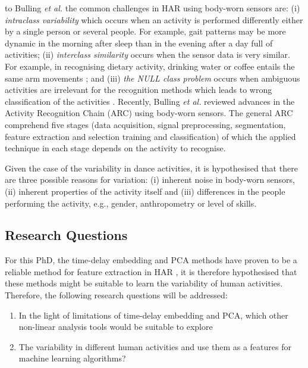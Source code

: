 \documentclass[10pt,journal,compsoc]{IEEEtran}
\begin{document}
 to Bulling \emph{et al.}  \cite{bulling2014} the common challenges in 
HAR using body-worn sensors are: 
(i) \textit{intraclass variability} which occurs when an activity is performed differently 
either by a single person or several people. For example, gait patterns may be more
dynamic in the morning after sleep than in the evening after a day full of activities; 
(ii) \textit{interclass similarity} occurs when the sensor data is very similar. For example,
in recognising dietary activity, drinking water or coffee entails the same arm movements 
\cite{amft2008phd};
and (iii) \textit{the NULL class problem} occurs 
when ambiguous activities are irrelevant for the recognition methods
which leads to wrong classification of the activities \cite{amft2011}.
Recently, Bulling \emph{et al.}  \cite{bulling2014} reviewed advances in 
the Activity Recognition Chain (ARC) using body-worn sensors.
The general ARC comprehend five stages (data acquisition, signal preprocessing, 
segmentation, feature extraction and selection training and classification) of which
the applied technique in each stage depends on the activity to recognise.

Given the case of the variability in dance activities, it is hypothesised that 
there are three possible reasons for variation:
(i) inherent noise in body-worn sensors, 
(ii) inherent properties of the activity itself and
(iii) differences in the people performing the activity,
e.g., gender, anthropometry or level of skills.

\subsection{Research Questions}

For this PhD, the time-delay embedding and PCA methods 
have proven to be a reliable method
for feature extraction in HAR \cite{Frank2010, Sama2013},
it is therefore hypothesised that these methods might be suitable 
to learn the variability of human activities.
Therefore, the following research questions will be addressed:
\begin{enumerate}
 \item In the light of limitations of time-delay embedding and PCA,
 which other non-linear analysis tools would be suitable to explore
\item The variability in different human activities and use them as a features 
 for machine learning algorithms?
 

\end{enumerate}
\end{document}
